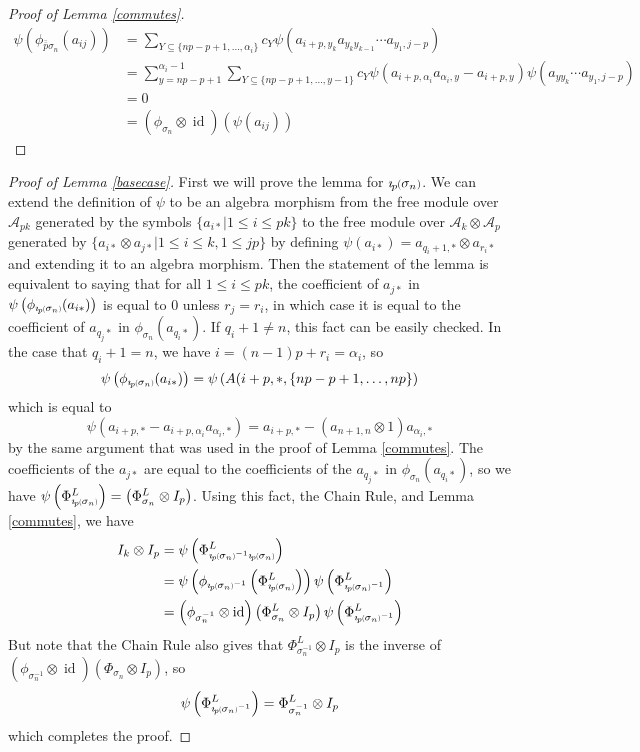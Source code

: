 \documentclass[11pt]{amsart}
\def\A{{\mathcal A}}
\def\s{{\sigma}}
\def\a{\alpha}
\def\fp{{\scriptstyle \bar{\bar{p}}}}
\newcommand*{\smallp}[1]{\scalebox{.75}{\ensuremath#1}}
\newcommand*{\subsmallp}[1]{\scalebox{.5}{\ensuremath#1}}
\newcommand{\pp}[2][p]{\imath_{\hspace*{-1pt}#1}\hspace*{-.5pt}\smallp(#2\smallp)}
\newcommand{\subpp}[2][p]{\imath_{\hspace*{-1pt}#1}\hspace*{-.5pt}\subsmallp(#2\subsmallp)}
\newcommand\id{\operatorname{id}}
\theoremstyle{definition}
\begin{document}
\begin{proof} [Proof of Lemma \ref{commutes}]
\begin{align*}
\psi\left(\phi_{\fp \s_n}(a_{ij})\right) &= \sum_{Y\subseteq \{np-p+1,\ldots,\a_i\}}c_Y\psi(a_{i+p,y_k}a_{y_ky_{k-1}}\cdots a_{y_1,j-p})\\
&= \sum_{y=np-p+1}^{\a_i-1}\sum_{Y\subseteq \{np-p+1,\ldots,y-1\}}c_Y\psi\left(a_{i+p,\a_i}a_{\a_i,y} - a_{i+p,y}\right)\psi\left(a_{yy_k}\cdots a_{y_1,j-p}\right)\\
&= 0\\
&= (\phi_{\s_n} \otimes \id)(\psi(a_{ij}))
\end{align*}




\end{proof}



\begin{proof} [Proof of Lemma \ref{basecase}]
First we will prove the lemma for $\pp{\s_n}$.  We can extend the definition of $\psi$ to be an algebra morphism from the free module over $\A_{pk}$ generated by the symbols $\{a_{i*}|1\le i\le pk\}$ to the free module over $\A_{k}\otimes \A_{p}$ generated by $\{a_{i*}\otimes a_{j*}|1\le i\le k, 1\le j p\}$ by defining $\psi(a_{i*}) = a_{q_i + 1,*}\otimes a_{r_i*}$ and extending it to an algebra morphism.  Then the statement of the lemma is equivalent to saying that for all $1\le i\le pk$, the coefficient of $a_{j*}$ in $\psi\left(\phi_{\subpp{\s_n}}(a_{i*})\right)$ is equal to 0 unless $r_j = r_i$, in which case it is equal to the coefficient of $a_{q_j*}$ in $\phi_{\s_n}(a_{q_i*})$.  If $q_i + 1 \ne n$, this fact can be easily checked.  In the case that $q_i + 1 = n$, we have $i = (n-1)p + r_i = \a_i$, so
$$\psi\left(\phi_{\subpp{\s_n}}(a_{i*})\right) = \psi\left(A(i+p,*,\{np-p+1,\ldots,np\}\right)$$
\noindent which is equal to
$$\psi(a_{i+p,*} - a_{i+p,\a_i}a_{\a_i,*}) = a_{i+p,*} - (a_{n+1,n}\otimes 1)a_{\a_i,*}$$
by the same argument that was used in the proof of Lemma \ref{commutes}.  The coefficients of the $a_{j*}$ are equal to the coefficients of the $a_{q_j*}$ in $\phi_{\s_n}(a_{q_i*})$, so we have $\psi\left(\Phi_{\subpp{\s_n}}^L\right) = \left(\Phi_{\s_n}^L\otimes I_p\right)$.  Using this fact, the Chain Rule, and Lemma \ref{commutes}, we have
\begin{align*}
I_k\otimes I_p &= \psi\left(\Phi_{\subpp{\s_n}^{-1}\subpp{\s_n}}^L\right)\\
&= \psi\left(\phi_{\subpp{\s_n}^{-1}}\left(\Phi_{\subpp{\s_n}}^L\right)\right)\psi\left(\Phi_{\subpp{\s_n}^{-1}}^L\right)\\
&= \left(\phi_{\s_n^{-1}}\otimes \id\right)\left(\Phi_{\s_n}^L\otimes I_p\right)\psi\left(\Phi_{\subpp{\s_n}^{-1}}^L\right)\\
\end{align*}
But note that the Chain Rule also gives that $\Phi_{\s_n^{-1}}^L\otimes I_p$ is the inverse of $\left(\phi_{\s_n^{-1}}\otimes \id\right)\left(\Phi_{\s_n}\otimes I_p\right)$, so 
$$\psi\left(\Phi_{\subpp{\s_n}^{-1}}^L\right) = \Phi_{\s_n^{-1}}^L\otimes I_p$$
\noindent which completes the proof.
\end{proof}
\end{document}
